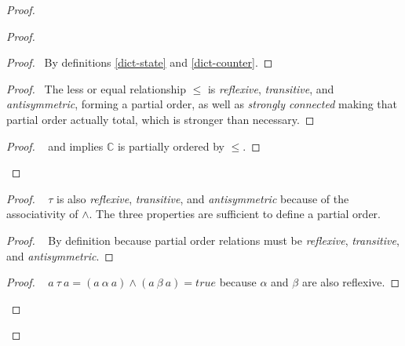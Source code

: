 \documentclass[11pt, oneside]{article}   	%
\begin{document}
\begin{proof}
\begin{proof}
			\begin{proof}
				\pf~By definitions \ref{dict-state} and \ref{dict-counter}.
			\end{proof}
			
			\begin{proof}
				\pf~The less or equal relationship $\leq$ is \textit{reflexive}, \textit{transitive}, and \textit{antisymmetric}, forming a partial order, as well as \textit{strongly connected} making that partial order actually total, which is stronger than necessary.
			\end{proof}

			\qedstep
			\begin{proof}
				\pf~ and  implies $\mathds{C}$ is partially ordered by $\leq$.
			\end{proof}
		\end{proof}
		
		\begin{proof}
			\pfsketch~ $\tau$ is also \textit{reflexive}, \textit{transitive}, and \textit{antisymmetric} because of the associativity of $\wedge$. The three properties are sufficient to define a partial order.
			\begin{proof}
				\pf~ By definition because partial order relations must be \textit{reflexive}, \textit{transitive}, and \textit{antisymmetric}.
			\end{proof}
	
			\begin{proof}
				\pf~ $a ~\tau~ a = (a ~\alpha~ a) \wedge (a ~\beta~ a) = true$ because  $\alpha$ and $\beta$ are also reflexive.
			\end{proof}
			

\end{proof}
\end{proof}
\end{document}
